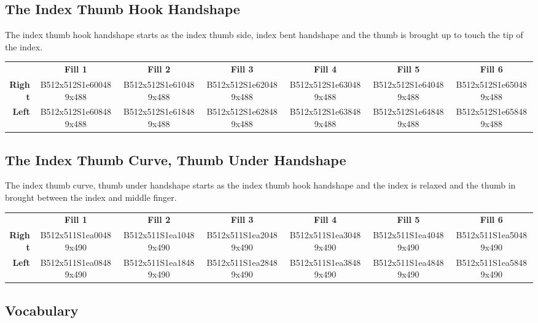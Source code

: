 \documentclass{article}
\begin{document}
\subsection{The Index Thumb Hook Handshape}

The index thumb hook handshape starts as the index thumb side, index bent handshape and the thumb is brought up to touch the tip of the index.

\begin{center}
\begin{tabular}{r*{6}{c}}
&\textbf{Fill 1}&\textbf{Fill 2}&\textbf{Fill 3}&\textbf{Fill 4}&\textbf{Fill 5}&\textbf{Fill 6}\\
\textbf{Right}&
B512x512S1e600489x488&
B512x512S1e610489x488&
B512x512S1e620489x488&
B512x512S1e630489x488&
B512x512S1e640489x488&
B512x512S1e650489x488\\
\textbf{Left}&
B512x512S1e608489x488&
B512x512S1e618489x488&
B512x512S1e628489x488&
B512x512S1e638489x488&
B512x512S1e648489x488&
B512x512S1e658489x488\\
\end{tabular}
\end{center}

\subsection{The Index Thumb Curve, Thumb Under Handshape}

The index thumb curve, thumb under handshape starts as the index thumb hook handshape and the index is relaxed and the thumb in brought between the index and middle finger.

\begin{center}
\begin{tabular}{r*{6}{c}}
&\textbf{Fill 1}&\textbf{Fill 2}&\textbf{Fill 3}&\textbf{Fill 4}&\textbf{Fill 5}&\textbf{Fill 6}\\
\textbf{Right}&
B512x511S1ea00489x490&
B512x511S1ea10489x490&
B512x511S1ea20489x490&
B512x511S1ea30489x490&
B512x511S1ea40489x490&
B512x511S1ea50489x490\\
\textbf{Left}&
B512x511S1ea08489x490&
B512x511S1ea18489x490&
B512x511S1ea28489x490&
B512x511S1ea38489x490&
B512x511S1ea48489x490&
B512x511S1ea58489x490\\
\end{tabular}
\end{center}

\subsection{Vocabulary}
\end{document}
